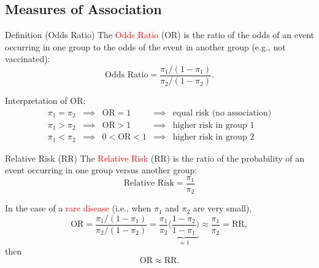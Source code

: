 \documentclass[oneside]{book}\usepackage[]{graphicx}\usepackage[svgnames]{xcolor}
\newcommand{\OR}{\text{OR}}%
\newcommand{\RR}{\text{RR}}%
\begin{document}
\subsection*{Measures of Association}
\begin{Regular}{Definition (Odds Ratio)}
      The \textcolor{Red}{Odds Ratio} (OR) is the ratio of the odds of an event occurring in one
      group to the odds of the event in another group (e.g., not vaccinated):
      \[ \text{Odds Ratio}=\frac{\pi_1/(1-\pi_1)}{\pi_2/(1-\pi_2)}. \]
\end{Regular}
Interpretation of OR:
\[ \begin{array}{ccccc}
            \pi_1=\pi_2 & \implies & \OR=1   & \implies & \text{equal risk (no association)} \\
            \pi_1>\pi_2 & \implies & \OR>1   & \implies & \text{higher risk in group 1}      \\
            \pi_1<\pi_2 & \implies & 0<\OR<1 & \implies & \text{higher risk in group 2}
      \end{array} \]
\begin{Regular}{Relative Risk (RR)}
      The \textcolor{Red}{Relative Risk} (RR) is the ratio of the probability of an event occurring in one group versus another group:
      \[ \text{Relative Risk}=\frac{\pi_1}{\pi_2} \]
\end{Regular}
In the case of a \textcolor{Red}{rare disease} (i.e., when $ \pi_1 $ and $ \pi_2 $ are very small),
\[ \OR=\frac{\pi_1/(1-\pi_1)}{\pi_2/(1-\pi_2)}=\frac{\pi_1}{\pi_2}\underbrace{\biggl(\frac{1-\pi_2}{1-\pi_1}\biggr)}_{\approx 1}\approx \frac{\pi_1}{\pi_2} =\RR,  \]
then
\[ \OR\approx\RR. \]
\end{document}
